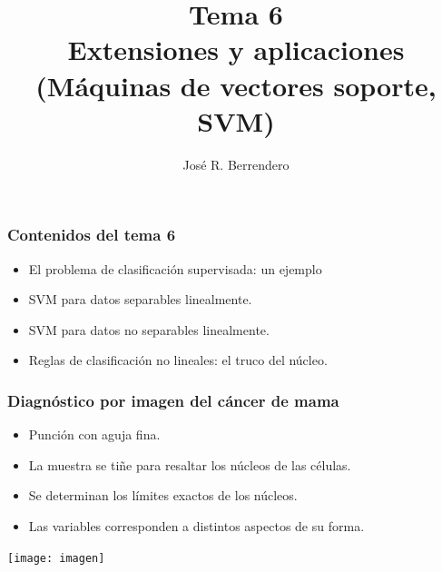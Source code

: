 \documentclass[dvipsnames, pdflatex,slidecentered]{beamer}
\title[Estad\'{\i}stica: Tema 6]{Tema 6\\
Extensiones y aplicaciones\\
(Máquinas de vectores soporte, SVM)}
\author[Berrendero]
{Jos\'{e} R. Berrendero}
\date{}
\institute{Departamento de Matem\'{a}ticas\\
 Universidad Aut\'{o}noma de Madrid}
\begin{document}
\begin{frame}[plain]

\vspace{2cm}
\titlepage


\end{frame}
\begin{frame}[plain]
\frametitle{Contenidos del tema 6}

\begin{itemize}
 

  \item El problema de clasificación supervisada: un ejemplo
  \item SVM para datos separables linealmente.
  \item SVM para datos no separables linealmente.
  \item Reglas de clasificación no lineales: el truco del núcleo.

  
 
\end{itemize}


\end{frame}
\begin{frame}[plain]
\frametitle{Diagnóstico por imagen del cáncer de mama}

\begin{minipage}{5cm}
\begin{itemize}
\item Punción con aguja fina.
\item La muestra se tiñe para resaltar los núcleos de las células.
\item Se determinan los límites exactos de los núcleos.
\item Las variables corresponden a distintos aspectos de su forma. 
\end{itemize}
\end{minipage}
\begin{minipage}{5cm}
\centerline{{\texttt{[image: imagen]}}}
\end{minipage}

\end{frame}
\end{document}
